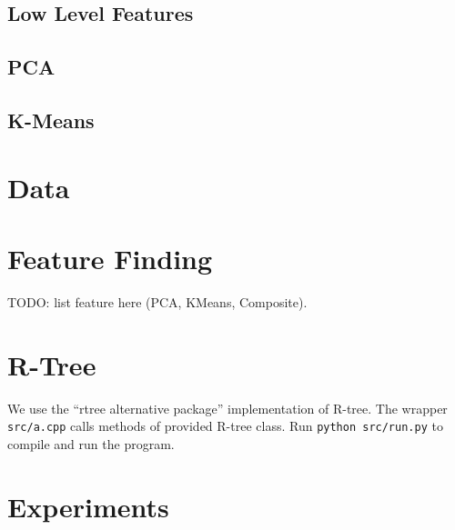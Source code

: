 \documentclass{acm_proc_article-sp}
\begin{document}
\subsection{Low Level Features}

\subsection{PCA}

\subsection{K-Means}

\section{Data}

\section{Feature Finding}

TODO: list feature here (PCA, KMeans, Composite).

\section{R-Tree}
We use the ``rtree alternative package'' implementation of R-tree.
The wrapper \texttt{src/a.cpp} calls methods of provided R-tree class.
Run \texttt{python src/run.py} to compile and run the program.

\section{Experiments}
\end{document}
